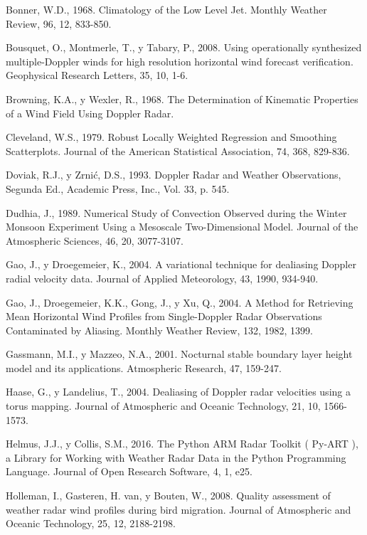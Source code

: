 \documentclass[12pt,spanish,oneside]{book}
\begin{document}
\hypertarget{ref-Bonner1968}{}
Bonner, W.D., 1968. Climatology of the Low Level Jet. Monthly Weather
Review, 96, 12, 833-850.

\hypertarget{ref-Bousquet2008}{}
Bousquet, O., Montmerle, T., y Tabary, P., 2008. Using operationally
synthesized multiple-Doppler winds for high resolution horizontal wind
forecast verification. Geophysical Research Letters, 35, 10, 1-6.

\hypertarget{ref-Browning1968}{}
Browning, K.A., y Wexler, R., 1968. The Determination of Kinematic
Properties of a Wind Field Using Doppler Radar.

\hypertarget{ref-Cleveland1979}{}
Cleveland, W.S., 1979. Robust Locally Weighted Regression and Smoothing
Scatterplots. Journal of the American Statistical Association, 74, 368,
829-836.

\hypertarget{ref-Doviak1993}{}
Doviak, R.J., y Zrnić, D.S., 1993. Doppler Radar and Weather
Observations, Segunda Ed., Academic Press, Inc., Vol. 33, p. 545.

\hypertarget{ref-Dudhia1989}{}
Dudhia, J., 1989. Numerical Study of Convection Observed during the
Winter Monsoon Experiment Using a Mesoscale Two-Dimensional Model.
Journal of the Atmospheric Sciences, 46, 20, 3077-3107.

\hypertarget{ref-Gao2004}{}
Gao, J., y Droegemeier, K., 2004. A variational technique for dealiasing
Doppler radial velocity data. Journal of Applied Meteorology, 43, 1990,
934-940.

\hypertarget{ref-Gao2004a}{}
Gao, J., Droegemeier, K.K., Gong, J., y Xu, Q., 2004. A Method for
Retrieving Mean Horizontal Wind Profiles from Single-Doppler Radar
Observations Contaminated by Aliasing. Monthly Weather Review, 132,
1982, 1399.

\hypertarget{ref-Gassmann2001}{}
Gassmann, M.I., y Mazzeo, N.A., 2001. Nocturnal stable boundary layer
height model and its applications. Atmospheric Research, 47, 159-247.

\hypertarget{ref-Haase2004}{}
Haase, G., y Landelius, T., 2004. Dealiasing of Doppler radar velocities
using a torus mapping. Journal of Atmospheric and Oceanic Technology,
21, 10, 1566-1573.

\hypertarget{ref-Helmus2016}{}
Helmus, J.J., y Collis, S.M., 2016. The Python ARM Radar Toolkit (
Py-ART ), a Library for Working with Weather Radar Data in the Python
Programming Language. Journal of Open Research Software, 4, 1, e25.

\hypertarget{ref-Holleman2008}{}
Holleman, I., Gasteren, H. van, y Bouten, W., 2008. Quality assessment
of weather radar wind profiles during bird migration. Journal of
Atmospheric and Oceanic Technology, 25, 12, 2188-2198.
\end{document}
